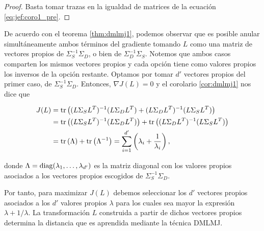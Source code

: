 \begin{proof}
    Basta tomar trazas en la igualdad de matrices de la ecuación \ref{eq:jef:coro1_pre}.

\end{proof}

De acuerdo con el teorema \ref{thm:dmlmj1}, podemos observar que es posible anular simultáneamente ambos términos del gradiente tomando $L$ como una matriz de vectores propios de $\Sigma_S^{-1}\Sigma_D$, o bien de $\Sigma_D^{-1}\Sigma_S$. Notemos que ambos casos comparten los mismos vectores propios y cada opción tiene como valores propios los inversos de la opción restante. Optamos por tomar $d'$ vectores propios del primer caso, de $\Sigma_S^{-1}\Sigma_D$. Entonces, $\nabla J(L) = 0$ y el corolario \ref{cor:dmlmj1} nos dice que

\begin{align*}
    J(L) &= \operatorname{tr}\left( (L\Sigma_S L^T)^{-1} (L\Sigma_D L^T) + (L \Sigma_D L^T)^{-1} (L \Sigma_S L^T) \right) \\
         &= \operatorname{tr}\left( (L\Sigma_S L^T)^{-1} (L\Sigma_D L^T)\right) + \operatorname{tr}\left((L \Sigma_D L^T)^{-1} (L \Sigma_S L^T) \right) \\
         &= \operatorname{tr}\left(\Lambda\right) + \operatorname{tr}\left(\Lambda^{-1}\right) = \sum\limits_{i=1}^{d'} \left( \lambda_i + \frac{1}{\lambda_i} \right),
\end{align*}

donde $\Lambda = \operatorname{diag}(\lambda_1,\dots,\lambda_{d'})$ es la matriz diagonal con los valores propios asociados a los vectores propios escogidos de $\Sigma_S^{-1}\Sigma_D$.

Por tanto, para maximizar $J(L)$ debemos seleccionar los $d'$ vectores propios asociados a los $d'$ valores propios $\lambda$ para los cuales sea mayor la expresión $\lambda + 1/\lambda$. La transformación $L$ construida a partir de dichos vectores propios determina la distancia que es aprendida mediante la técnica DMLMJ.

